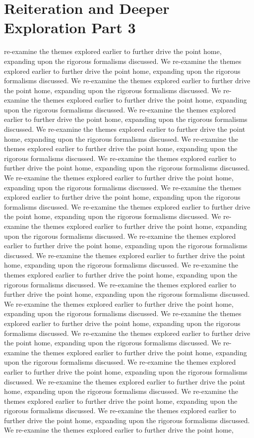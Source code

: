 \section{Reiteration and Deeper Exploration Part 3}\nWe re-examine the themes explored earlier to further drive the point home, expanding upon the rigorous formalisms discussed. We re-examine the themes explored earlier to further drive the point home, expanding upon the rigorous formalisms discussed. We re-examine the themes explored earlier to further drive the point home, expanding upon the rigorous formalisms discussed. We re-examine the themes explored earlier to further drive the point home, expanding upon the rigorous formalisms discussed. We re-examine the themes explored earlier to further drive the point home, expanding upon the rigorous formalisms discussed. We re-examine the themes explored earlier to further drive the point home, expanding upon the rigorous formalisms discussed. We re-examine the themes explored earlier to further drive the point home, expanding upon the rigorous formalisms discussed. We re-examine the themes explored earlier to further drive the point home, expanding upon the rigorous formalisms discussed. We re-examine the themes explored earlier to further drive the point home, expanding upon the rigorous formalisms discussed. We re-examine the themes explored earlier to further drive the point home, expanding upon the rigorous formalisms discussed. We re-examine the themes explored earlier to further drive the point home, expanding upon the rigorous formalisms discussed. We re-examine the themes explored earlier to further drive the point home, expanding upon the rigorous formalisms discussed. We re-examine the themes explored earlier to further drive the point home, expanding upon the rigorous formalisms discussed. We re-examine the themes explored earlier to further drive the point home, expanding upon the rigorous formalisms discussed. We re-examine the themes explored earlier to further drive the point home, expanding upon the rigorous formalisms discussed. We re-examine the themes explored earlier to further drive the point home, expanding upon the rigorous formalisms discussed. We re-examine the themes explored earlier to further drive the point home, expanding upon the rigorous formalisms discussed. We re-examine the themes explored earlier to further drive the point home, expanding upon the rigorous formalisms discussed. We re-examine the themes explored earlier to further drive the point home, expanding upon the rigorous formalisms discussed. We re-examine the themes explored earlier to further drive the point home, expanding upon the rigorous formalisms discussed. We re-examine the themes explored earlier to further drive the point home, expanding upon the rigorous formalisms discussed. We re-examine the themes explored earlier to further drive the point home, expanding upon the rigorous formalisms discussed. We re-examine the themes explored earlier to further drive the point home, expanding upon the rigorous formalisms discussed. We re-examine the themes explored earlier to further drive the point home, expanding upon the rigorous formalisms discussed. We re-examine the themes explored earlier to further drive the point home, 